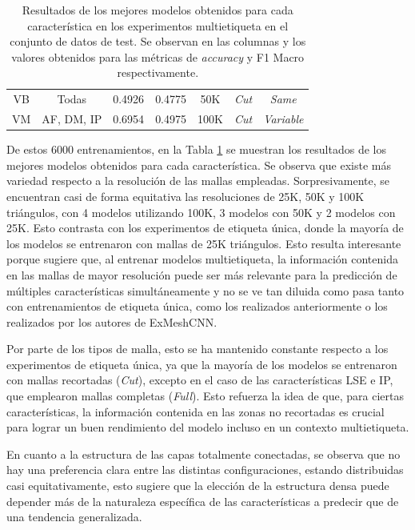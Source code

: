 \begin{table}[h]
{\begin{tabular}{|cc|c|c|c|c|c|}
        \multicolumn{1}{|c|}{VB} & Todas & 0.4926 & 0.4775 & 50K & \textit{Cut} & \textit{Same} \\
        \multicolumn{1}{|c|}{VM} & AF, DM, IP & 0.6954 & 0.4975 & 100K & \textit{Cut} & \textit{Variable} \\ \hline
    \end{tabular}%
    }
    \caption[Resultados de los mejores modelos obtenidos para cada característica en los experimentos multietiqueta]{Resultados de los mejores modelos obtenidos para cada característica en los experimentos multietiqueta en el conjunto de datos de test. Se observan en las columnas  y  los valores obtenidos para las métricas de \textit{accuracy} y F1 Macro respectivamente.}
    \label{table5:multilabel_results}
    \end{table}

De estos 6000 entrenamientos, en la Tabla \ref{table5:multilabel_results} se muestran los resultados de los mejores modelos obtenidos para cada característica. Se observa que existe más variedad respecto a la resolución de las mallas empleadas. Sorpresivamente, se encuentran casi de forma equitativa las resoluciones de 25K, 50K y 100K triángulos, con 4 modelos utilizando 100K, 3 modelos con 50K y 2 modelos con 25K. Esto contrasta con los experimentos de etiqueta única, donde la mayoría de los modelos se entrenaron con mallas de 25K triángulos. Esto resulta interesante porque sugiere que, al entrenar modelos multietiqueta, la información contenida en las mallas de mayor resolución puede ser más relevante para la predicción de múltiples características simultáneamente y no se ve tan diluida como pasa tanto con entrenamientos de etiqueta única, como los realizados anteriormente o los realizados por los autores de ExMeshCNN.

Por parte de los tipos de malla, esto se ha mantenido constante respecto a los experimentos de etiqueta única, ya que la mayoría de los modelos se entrenaron con mallas recortadas (\textit{Cut}), excepto en el caso de las características LSE e IP, que emplearon mallas completas (\textit{Full}). Esto refuerza la idea de que, para ciertas características, la información contenida en las zonas no recortadas es crucial para lograr un buen rendimiento del modelo incluso en un contexto multietiqueta.

En cuanto a la estructura de las capas totalmente conectadas, se observa que no hay una preferencia clara entre las distintas configuraciones, estando distribuidas casi equitativamente, esto sugiere que la elección de la estructura densa puede depender más de la naturaleza específica de las características a predecir que de una tendencia generalizada.

